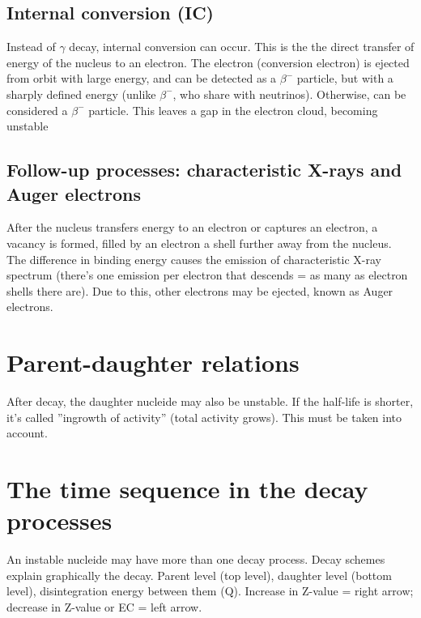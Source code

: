 \subsection{Internal conversion (IC)} Instead of $\gamma$ decay, internal conversion can occur. This is the the direct transfer of energy of the nucleus to an electron. The electron (conversion electron) is ejected from orbit with large energy, and can be detected as a $\beta^{-}$ particle, but with a sharply defined energy (unlike $\beta^{-}$, who share with neutrinos). Otherwise, can be considered a $\beta^{-}$ particle. This leaves a gap in the electron cloud, becoming unstable
\subsection{Follow-up processes: characteristic X-rays and Auger electrons} After the nucleus transfers energy to an electron or captures an electron, a vacancy is formed, filled by an electron a shell further away from the nucleus. The difference in binding energy causes the emission of characteristic X-ray spectrum (there's one emission per electron that descends = as many as electron shells there are). Due to this, other electrons may be ejected, known as Auger electrons.
\section{Parent-daughter relations}
After decay, the daughter nucleide may also be unstable. If the half-life is shorter, it's called ''ingrowth of activity'' (total activity grows). This must be taken into account.
\section{The time sequence in the decay processes}
An instable nucleide may have more than one decay process. Decay schemes explain graphically the decay. Parent level (top level), daughter level (bottom level), disintegration energy between them (Q). Increase in Z-value = right arrow; decrease in Z-value or EC = left arrow. 

